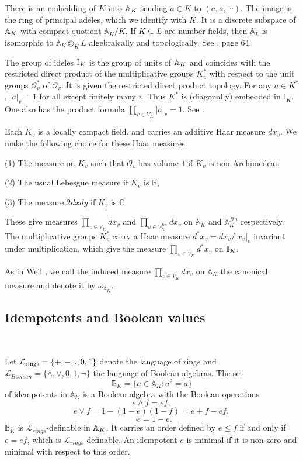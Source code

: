 \documentclass[12pt]{amsart}
\def\A{\mathbb{A}}
\def\B{\mathbb{B}}
\def\I{\mathbb{I}}
\def\R{\mathbb{R}}
\def\C{\mathbb{C}}
\def\cL{\mathcal{L}}
\def\C{\mathbb{C}}
\def\R{\mathbb{R}}
\def\cL{\mathcal{L}}
\def\cO{\mathcal{O}}
\numberwithin{equation}{section}
\begin{document}
There is an embedding of $K$ into $\Bbb A_K$ sending $a\in K$ to $(a,a,\cdots)$. The image is the ring of principal 
adeles, which we identify with $K$. It is a discrete subspace of $\Bbb A_K$ with compact quotient $\A_K/K$. 
If $K\subseteq L$ are number fields, then 
$\A_L$ is isomorphic to $\A_K \otimes_{K} L$ algebraically and topologically. See \cite{CF}, page 64.

The group of ideles $\Bbb I_K$ is the group of units of $\Bbb A_K$ and coincides with the restricted direct product of the multiplicative groups $K_v^*$ with respect to 
the unit groups $\cO_v^*$ of $\mathcal{O}_v$. It is given the restricted direct product topology. For any $a\in K^*$, $|a|_v=1$ for all except finitely many $v$. Thus 
$K^*$ is (diagonally) embedded in $\I_K$. One also has the product formula $\prod_{v\in V_K} |a|_v=1$. See \cite[pp.60]{CF}.

Each $K_v$ is a locally compact field, and carries an additive Haar measure $dx_v$. We make the following choice for these Haar measures:

(1) The measure on $K_v$ such that $\mathcal{O}_v$ has volume $1$ if $K_v$ is non-Archimedean

(2) The usual Lebesgue measure if $K_v$ is $\R$,

(3) The measure $2dxdy$ if $K_v$ is $\C$.

These give measures $\prod_{v\in V_K} dx_v$ and $\prod_{v\in V_K^{fin}} dx_v$ 
on $\A_K$ and $\A_K^{fin}$ respectively. The multiplicative groups  
$K_v^*$ carry a Haar 
measure $d^*x_v=dx_v/|x_v|_v$ invariant under multiplication, which 
give the measure $\prod_{v\in V_K} d^*x_v$ on 
$\Bbb I_K$.

As in Weil \cite{weil-adeles-gps}, we call 
the induced measure $\prod_{v\in V_K} dx_v$ on $\A_K$ the canonical measure and denote it by $\omega_{\A_K}$. 

\medskip

\subsection{\bf Idempotents and Boolean values}\label{ssec-idem} 

\

\medskip

Let $\cL_{\rm{rings}}=\{+,-,.,0,1\}$ denote the language of rings and $\cL_{Boolean}=\{\wedge,\vee,0,1,\neg\}$ the language of Boolean algebras. The set 
$$\B_K=\{a\in \A_K: a^2=a\}$$
of idempotents in $\A_K$ is a Boolean algebra 
with the Boolean operations
$$e\wedge f=ef,$$ 
$$e\vee f=1-(1-e)(1-f)=e+f-ef,$$ 
$$\neg e=1-e.$$ 
$\B_K$ is $\cL_{rings}$-definable in $\Bbb A_K$. It carries an order defined by $e\leq f$ if and only if $e=ef$, which is $\cL_{rings}$-definable.
An idempotent $e$ is minimal if it is non-zero and minimal with respect to this order. 
\end{document}
